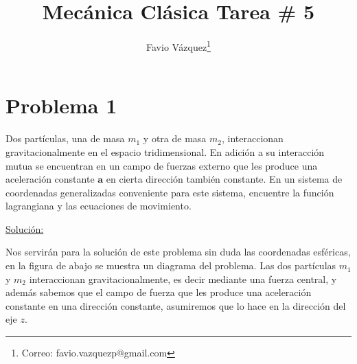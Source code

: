 \documentclass[a4paper,10pt]{article}
\title{Mecánica Clásica Tarea \# 5}
\author{Favio Vázquez\thanks{Correo: favio.vazquezp@gmail.com}}\affil{Instituto de Ciencias Nucleares. Universidad Nacional Autónoma de México.}
\date{}
\numberwithin{equation}{section}
\begin{document}
\makeatletter
\def\@maketitle{%
  \newpage
  \null
  \vskip 2em%
  \begin{center}%
  \let \footnote \thanks
    {\Large\bfseries \@title \par}%
    \vskip 1.5em%
    {\normalsize
      \lineskip .5em%
      \begin{tabular}[t]{c}%
        \@author
      \end{tabular}\par}%
    \vskip 1em%
    {\normalsize \@date}%
  \end{center}%
  \par
  \vskip 1.5em}
\makeatother

\maketitle

\section{Problema 1}

Dos partículas, una de masa $m_1$ y otra de masa $m_2$, interaccionan gravitacionalmente 
en el espacio tridimensional. En adición a su interacción mutua se encuentran en un campo 
de fuerzas externo que les produce una aceleración constante $\mathbf{a}$ en cierta 
dirección también constante. En un sistema de coordenadas generalizadas conveniente para este 
sistema, encuentre la función lagrangiana y las ecuaciones de movimiento.

\vspace{.3cm}

\underline{Solución:} \vspace{.3cm}

Nos servirán para la solución de este problema sin duda las coordenadas esféricas, 
en la figura de abajo se muestra un diagrama del problema. Las dos partículas $m_1$ y 
$m_2$ interaccionan gravitacionalmente, es decir mediante una fuerza central, y además 
sabemos que el campo de fuerza que les produce una aceleración constante en 
una dirección constante, asumiremos que lo hace en la dirección del eje $z$.
\end{document}
